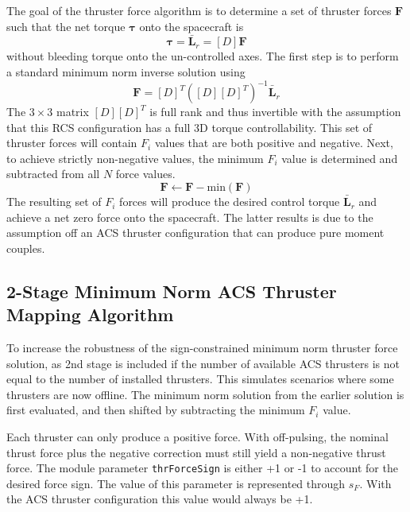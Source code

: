 The goal of the thruster force algorithm is to determine a set of thruster forces $\bm F$ such that the net torque $\bm \tau$ onto the spacecraft is
\begin{equation}
	\label{eq:th:2}
	\bm\tau = \bar{\bm L}_{r}  = [D]\bm F
\end{equation}
without bleeding torque onto the un-controlled axes.  The first step is to perform a standard minimum norm inverse solution using
\begin{equation}
	\label{eq:th:min}
	\bm F = [D]^{T}([D][D]^{T})^{-1} \bar{\bm L}_{r}
\end{equation}
The $3\times 3$ matrix $[D][D]^{T}$ is full rank and thus invertible with the assumption that this RCS configuration has a full 3D torque controllability.  This set of  thruster forces will contain $F_{i}$ values that are both positive and negative.  Next, to achieve strictly non-negative values, the minimum $F_{i}$ value is determined and subtracted from all $N$ force values.  
\begin{equation}
	\bm F \leftarrow \bm F -  \text{min}(\bm F)
\end{equation}
The resulting set of $F_{i}$ forces will produce the desired control torque $\bar{\bm L}_{r}$ and achieve a net zero force onto the spacecraft.  The latter results is due to the assumption off an ACS thruster configuration that can produce pure moment couples.  



\subsection{2-Stage Minimum Norm ACS Thruster Mapping Algorithm}
To increase the robustness of the sign-constrained minimum norm thruster force solution, as 2nd stage is included if the number of available ACS thrusters is not equal to the number of installed thrusters.  This simulates scenarios where some thrusters are now offline.    The minimum norm solution from the earlier solution is first evaluated, and then shifted by subtracting the minimum $F_{i}$ value.  

Each thruster can only produce a positive force.  With off-pulsing, the nominal thrust force plus the negative correction must still yield a non-negative thrust force.  The module parameter {\tt thrForceSign} is either +1 or -1 to account for the desired force sign.  The value of this parameter is represented through $s_{F}$.  With the ACS thruster configuration this value would always be +1.  

